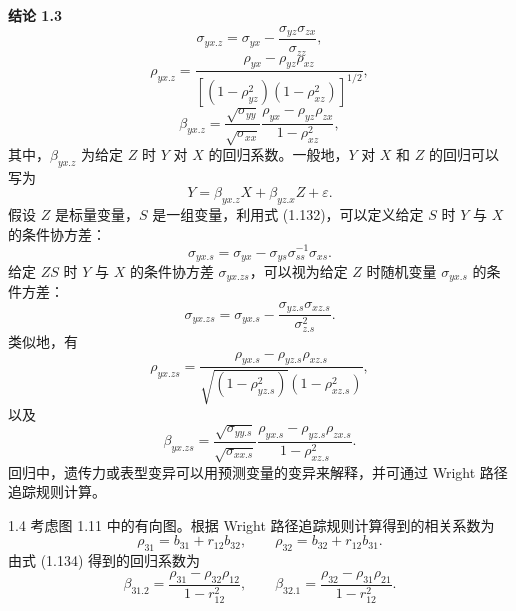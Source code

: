 \medskip\noindent\textbf{结论 1.3}
\begin{equation}
\sigma_{yx.z}=\sigma_{yx}-\frac{\sigma_{yz}\sigma_{zx}}{\sigma_{zz}},
\tag{1.132}
\end{equation}
\begin{equation}
\rho_{yx.z}=
\frac{\rho_{yx}-\rho_{yz}\rho_{xz}}
{\left[(1-\rho_{yz}^2)(1-\rho_{xz}^2)\right]^{1/2}},
\tag{1.133}
\end{equation}
\begin{equation}
\beta_{yx.z}=
\frac{\sqrt{\sigma_{yy}}}{\sqrt{\sigma_{xx}}}
\frac{\rho_{yx}-\rho_{yz}\rho_{zx}}{1-\rho_{xz}^2},
\tag{1.134}
\end{equation}
其中，$\beta_{yx.z}$ 为给定 $Z$ 时 $Y$ 对 $X$ 的回归系数。一般地，$Y$ 对 $X$ 和 $Z$ 的回归可以写为
\begin{equation}
Y=\beta_{yx.z}X+\beta_{yz.x}Z+\varepsilon.
\tag{1.135}
\end{equation}
假设 $Z$ 是标量变量，$S$ 是一组变量，利用式 (1.132)，可以定义给定 $S$ 时 $Y$ 与 $X$ 的条件协方差：
\begin{equation}
\sigma_{yx.s}=\sigma_{yx}-\sigma_{ys}\sigma_{ss}^{-1}\sigma_{xs}.
\tag{1.136}
\end{equation}
给定 $ZS$ 时 $Y$ 与 $X$ 的条件协方差 $\sigma_{yx.zs}$，可以视为给定 $Z$ 时随机变量 $\sigma_{yx.s}$ 的条件方差：
\begin{equation}
\sigma_{yx.zs}=\sigma_{yx.s}-
\frac{\sigma_{yz.s}\sigma_{xz.s}}{\sigma_{z.s}^2}.
\tag{1.137}
\end{equation}
类似地，有
\begin{equation}
\rho_{yx.zs}=
\frac{\rho_{yx.s}-\rho_{yz.s}\rho_{xz.s}}
{\sqrt{(1-\rho_{yz.s}^2)}(1-\rho_{xz.s}^2)},
\tag{1.138}
\end{equation}
以及
\begin{equation}
\beta_{yx.zs}=
\frac{\sqrt{\sigma_{yy.s}}}{\sqrt{\sigma_{xx.s}}}
\frac{\rho_{yx.s}-\rho_{yz.s}\rho_{zx.s}}{1-\rho_{xz.s}^2}.
\tag{1.139}
\end{equation}
回归中，遗传力或表型变异可以用预测变量的变异来解释，并可通过 Wright 路径追踪规则计算。

\begin{bookexample}{1.4}
考虑图 1.11 中的有向图。根据 Wright 路径追踪规则计算得到的相关系数为
\[
\rho_{31}=b_{31}+r_{12}b_{32},
\qquad
\rho_{32}=b_{32}+r_{12}b_{31}.
\]
由式 (1.134) 得到的回归系数为
\[
\beta_{31.2}=\frac{\rho_{31}-\rho_{32}\rho_{12}}{1-r_{12}^2},
\qquad
\beta_{32.1}=\frac{\rho_{32}-\rho_{31}\rho_{21}}{1-r_{12}^2}.
\]
\end{bookexample}

